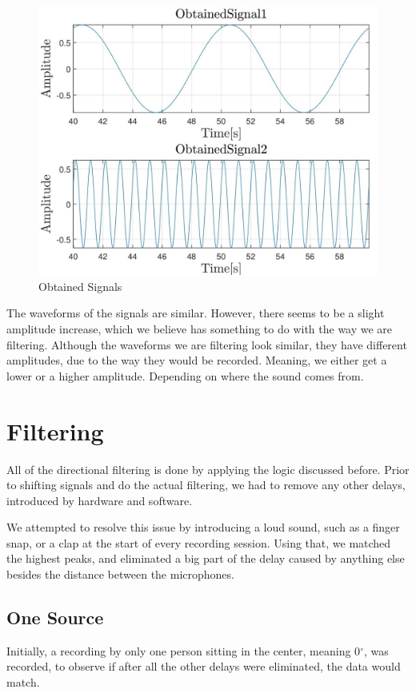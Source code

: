 \begin{figure}[htp]
	\centering
	\includegraphics[width=\textwidth]{Illustrations/obtainedSource1And2.jpg}
	\caption{Obtained Signals}
	\label{fig:obtainedSignals}
\end{figure}

The waveforms of the signals are similar. However, there seems to be a slight amplitude 
increase, which we believe has something to do with the way we are filtering. Although the
waveforms we are filtering look similar, they have different amplitudes, due to the way
they would be recorded. Meaning, we either get a lower or a higher amplitude. Depending on
where the sound comes from.

\newpage
\section{Filtering}
All of the directional filtering is done by applying the logic discussed before. 
Prior to shifting signals and do the actual filtering, we had to remove any other 
delays, introduced by hardware and software.

We attempted to resolve this issue by introducing a loud sound, such as a finger 
snap, or a clap at the start of every recording session. Using that, we matched the 
highest peaks, and eliminated a big part of the delay caused by anything else 
besides the distance between the microphones.

\subsection{One Source}
Initially, a recording by only one person sitting in the center, meaning 0$^\circ$, 
was recorded, to observe if after all the other delays were eliminated, the data 
would match.\\

